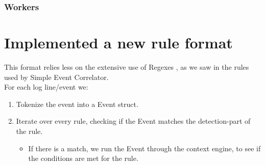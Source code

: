 \subsubsection{Workers}

\section{Implemented a new rule format}
This format relies less on the extensive use of Regexes , as we saw in the rules used by Simple Event Correlator. 
\\
For each log line/event we:

\begin{enumerate}
    \item Tokenize the event into a Event struct. 
    \item Iterate over every rule, checking if the Event matches the detection-part of the rule.
    \begin{itemize}
        \item If there is a match, we run the Event through the context engine, to see if the conditions are met for the rule.
    \end{itemize}
\end{enumerate}

